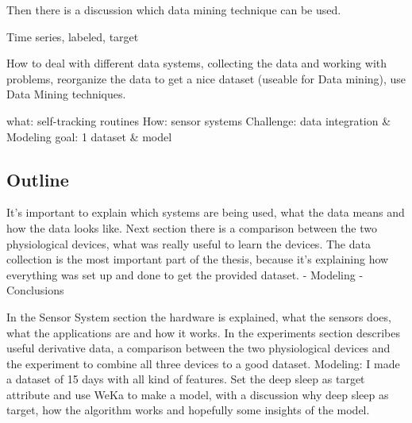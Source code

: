 		Then there is a discussion which data mining technique can be used. 


			
		Time series, labeled, target

		How to deal with different data systems, collecting the data and working with problems, reorganize the data to get a nice dataset (useable for Data mining), use Data Mining techniques.

		what: self-tracking routines
		How: sensor systems
		Challenge: data integration \& Modeling
		goal: 1 dataset \& model

	\subsection{Outline}
		It's important to explain which systems are being used, what the data means and how the data looks like. Next section there is a comparison between the two physiological devices, what was really useful to learn the devices. The data collection is the most important part of the thesis, because it's explaining how everything was set up and done to get the provided dataset. - Modeling - Conclusions 

		In the Sensor System section the hardware is explained, what the sensors does, what the applications are and how it works. 
		In the experiments section describes useful derivative data, a comparison between the two physiological devices and the experiment to combine all three devices to a good dataset.
		Modeling: I made a dataset of 15 days with all kind of features. Set the deep sleep as target attribute and use WeKa to make a model, with a discussion why deep sleep as target, how the algorithm works and hopefully some insights of the model. 

